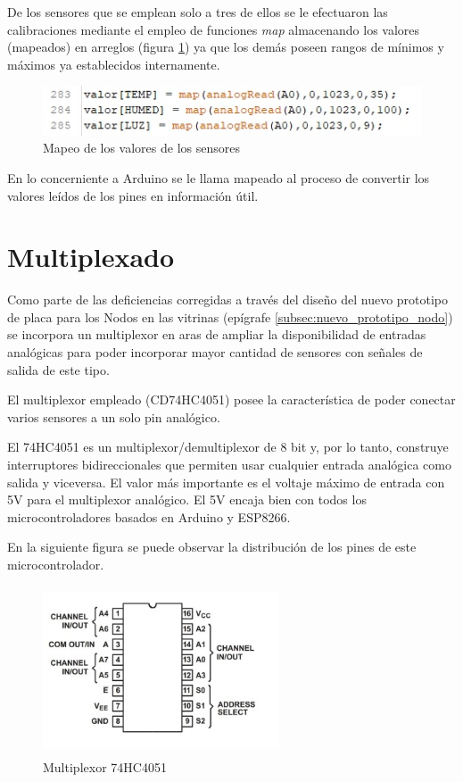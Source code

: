 De los sensores que se emplean solo a tres de ellos se le efectuaron las calibraciones mediante el empleo de funciones \textit{map} almacenando los valores (mapeados) en arreglos (figura \ref{imag:mapeo_sensores}) ya que los demás poseen rangos de mínimos y máximos ya establecidos internamente.

\begin{figure}[H]
    \centering
    \includegraphics{imagenes/mapeado.jpg}
    \caption{Mapeo de los valores de los sensores}
    \label{imag:mapeo_sensores}
\end{figure}

En lo concerniente a Arduino se le llama mapeado al proceso de convertir los valores leídos de los pines en información útil. 

\section{Multiplexado}

Como parte de las deficiencias corregidas a través del diseño del nuevo prototipo de placa para los Nodos en las vitrinas (epígrafe \ref{subsec:nuevo_prototipo_nodo}) se incorpora un multiplexor en aras de ampliar la disponibilidad
de entradas analógicas para poder incorporar mayor cantidad de sensores con señales de salida de este tipo.

El multiplexor empleado (CD74HC4051) posee la característica de poder conectar varios sensores a un solo pin analógico.

El 74HC4051 es un multiplexor/demultiplexor de 8 bit y, por lo tanto, construye interruptores bidireccionales que permiten usar cualquier entrada analógica como salida y viceversa. El valor más importante es el voltaje máximo de entrada con 5V para el multiplexor analógico. El 5V encaja bien con todos los microcontroladores basados en Arduino y ESP8266.

\newpage

En la siguiente figura se puede observar la distribución de los pines de este microcontrolador.

\begin{figure}[H]
    \centering
    \includegraphics[width=7cm, height=5cm]{imagenes/multiplexor.jpg}
    \caption{Multiplexor 74HC4051}
    \label{imag:multiplexor}
\end{figure}

